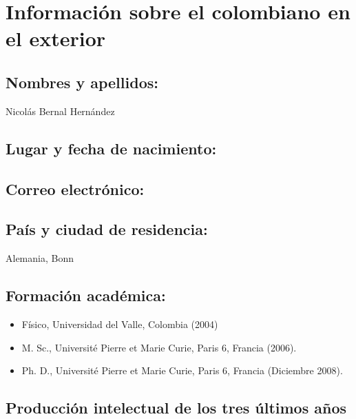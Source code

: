 \section{Información sobre el colombiano en el exterior}
\subsection{Nombres y apellidos: }
Nicolás Bernal Hernández
\subsection{Lugar y fecha de nacimiento: }
\fnbernal
\subsection{Correo electrónico: }
\embernal
\subsection{País y ciudad de residencia: }
Alemania, Bonn
\subsection{Formación académica:}
\begin{itemize}
\item Físico, Universidad del Valle, Colombia (2004)
\item M. Sc.,  Université Pierre et Marie Curie, Paris 6, Francia (2006).
\item Ph. D.,  Université Pierre et Marie Curie, Paris 6, Francia (Diciembre 2008).
\end{itemize}
\subsection{Producción intelectual de los tres últimos años}
